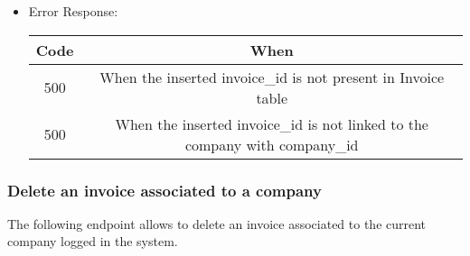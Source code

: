 \begin{itemize}
    \item Error Response:
    \begin{table}[!h]
    \centering 
    \begin{tabular}{|c|c|}
    \hline
    \multicolumn{1}{|c|}{\textbf{Code}} & \multicolumn{1}{c|}{\textbf{When}} \\ \hline
    500 & When the inserted invoice\_id is not present in Invoice table \\\hline
    500 & When the inserted invoice\_id is not linked to the company with company\_id \\\hline
    \end{tabular} 
    \end{table} 
    
\end{itemize}

\subsubsection*{Delete an invoice associated to a company}

The following endpoint allows to delete an invoice associated to the current company logged in the system.

